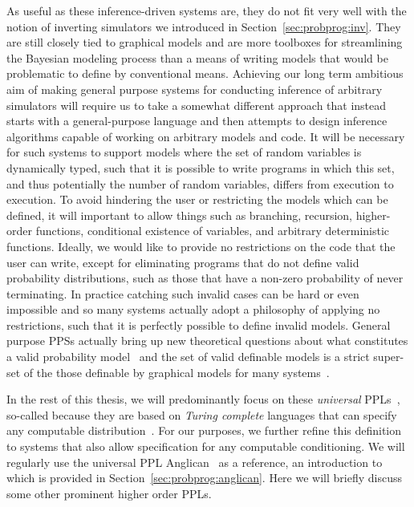 As useful as these inference-driven systems are, they do not fit very well with the notion of
inverting simulators we introduced in Section~\ref{sec:probprog:inv}.  They are still closely tied
to graphical models and are more toolboxes for streamlining the Bayesian modeling process than
a means of writing models that would be problematic to define by conventional means.  Achieving
our long term ambitious aim of making general purpose systems for conducting inference of
arbitrary simulators will require us to take a somewhat different approach that instead starts
with a general-purpose language and then attempts to design inference algorithms capable of
working on arbitrary models and code.  It will be necessary for such systems to
support models where the set of random variables is dynamically typed, such that it is possible 
to write programs in which this set, and thus potentially the number of random variables, differs 
from execution to execution.  To avoid hindering the user or restricting the models which can be
defined, it will important to allow 
things such as branching, recursion, higher-order functions,
conditional existence of variables, and arbitrary
deterministic functions.  Ideally, we would like to provide no restrictions on the code that the user
can write, except for eliminating programs that do not define valid probability distributions, such as
those that have a non-zero probability of never terminating.  In practice catching such invalid cases can
be hard or even impossible and so many systems actually adopt a philosophy of applying no restrictions,
such that it is perfectly possible to define invalid models.  General purpose PPSs actually bring up new
theoretical questions about what constitutes a valid probability model~\citep{heunen2017convenient} and
the set of valid definable models is a strict super-set of the those definable by graphical models 
for many systems~\citep{goodman2013principles}.

In the rest of this thesis, we will predominantly focus on these \emph{universal} PPLs~\citep{goodman_uai_2008,staton2016semantics}, 
so-called because they are based on \emph{Turing complete} languages that can specify any
computable distribution~\citep{goodman2013principles}.  For our purposes, we further refine this definition
to systems that also allow specification for any computable conditioning.
We will regularly use the universal PPL Anglican~\citep{wood2014new} as a reference, an introduction
to which is provided in Section~\ref{sec:probprog:anglican}. Here we will briefly discuss some other
prominent higher order PPLs.

